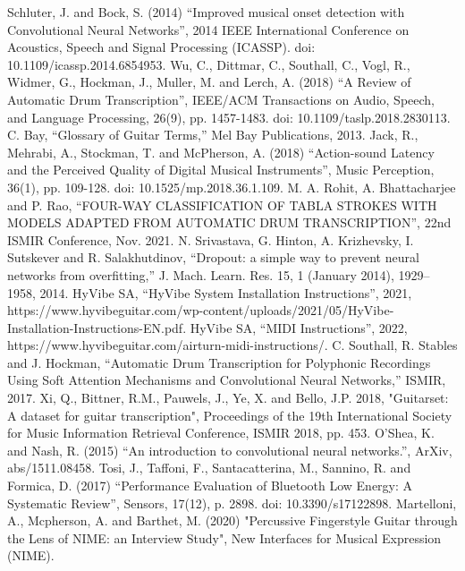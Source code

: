 \documentclass[conference]{IEEEtran}
\begin{document}
\begin{thebibliography}{00}
 Schluter, J. and Bock, S. (2014) ``Improved musical onset detection with Convolutional Neural Networks'', 2014 IEEE International Conference on Acoustics, Speech and Signal Processing (ICASSP). doi: 10.1109/icassp.2014.6854953.
 Wu, C., Dittmar, C., Southall, C., Vogl, R., Widmer, G., Hockman, J., Muller, M. and Lerch, A. (2018) ``A Review of Automatic Drum Transcription'', IEEE/ACM Transactions on Audio, Speech, and Language Processing, 26(9), pp. 1457-1483. doi: 10.1109/taslp.2018.2830113.
 C. Bay, ``Glossary of Guitar Terms,'' Mel Bay Publications, 2013.
 Jack, R., Mehrabi, A., Stockman, T. and McPherson, A. (2018) ``Action-sound Latency and the Perceived Quality of Digital Musical Instruments'', Music Perception, 36(1), pp. 109-128. doi: 10.1525/mp.2018.36.1.109.
 M. A. Rohit, A. Bhattacharjee and P. Rao, ``FOUR-WAY CLASSIFICATION OF TABLA STROKES WITH MODELS ADAPTED FROM AUTOMATIC DRUM TRANSCRIPTION'', 22nd ISMIR Conference, Nov. 2021.
 N. Srivastava, G. Hinton, A. Krizhevsky, I. Sutskever and R. Salakhutdinov, ``Dropout: a simple way to prevent neural networks from overfitting,'' J. Mach. Learn. Res. 15, 1 (January 2014), 1929–1958, 2014.
 HyVibe SA, ``HyVibe System Installation Instructions'', 2021, https://www.hyvibeguitar.com/wp-content/uploads/2021/05/HyVibe-Installation-Instructions-EN.pdf.
 HyVibe SA, ``MIDI Instructions'', 2022, https://www.hyvibeguitar.com/airturn-midi-instructions/.
 C. Southall, R. Stables and J. Hockman, ``Automatic Drum Transcription for Polyphonic Recordings Using Soft Attention Mechanisms and Convolutional Neural Networks,'' ISMIR, 2017.
 Xi, Q., Bittner, R.M., Pauwels, J., Ye, X. and Bello, J.P. 2018, "Guitarset: A dataset for guitar transcription", Proceedings of the 19th International Society for Music Information Retrieval Conference, ISMIR 2018, pp. 453.
 O'Shea, K. and Nash, R. (2015) ``An introduction to convolutional neural networks.'', ArXiv, abs/1511.08458.
 Tosi, J., Taffoni, F., Santacatterina, M., Sannino, R. and Formica, D. (2017) ``Performance Evaluation of Bluetooth Low Energy: A Systematic Review'', Sensors, 17(12), p. 2898. doi: 10.3390/s17122898.
 Martelloni, A., Mcpherson, A. and Barthet, M. (2020) "Percussive Fingerstyle Guitar through the Lens of NIME: an Interview Study", New Interfaces for Musical Expression (NIME).


\end{thebibliography}
\vspace{12pt}
\end{document}
